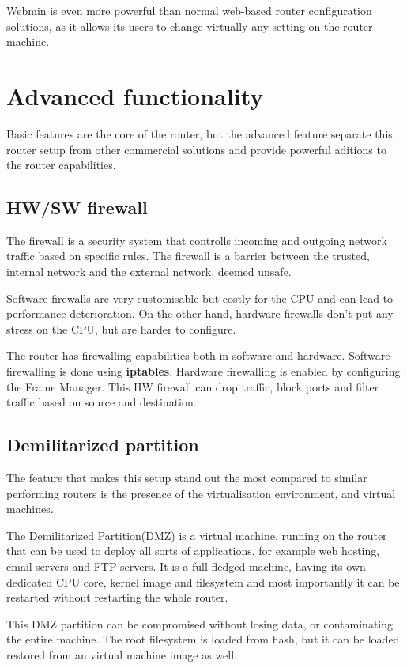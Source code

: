 Webmin is even more powerful than normal web-based router configuration
solutions, as it allows its users to change virtually any setting on the
router machine.

\section{Advanced functionality}
Basic features are the core of the router, but the advanced feature
separate this router setup from other commercial solutions and provide
powerful aditions to the router capabilities.

\subsection{HW/SW firewall}
\label{sub-sec:hw-firewall}
The firewall is a security system that controlls incoming and outgoing
network traffic based on specific rules. The firewall is a barrier 
between the trusted, internal network and the external network, deemed
unsafe.

Software firewalls are very customisable but costly for the CPU and can
lead to performance deterioration. On the other hand, hardware firewalls
don't put any stress on the CPU, but are harder to configure.

The router has firewalling capabilities both in software and hardware.
Software firewalling is done using \textbf{iptables}. Hardware firewalling
is enabled by configuring the Frame Manager. This HW firewall can drop
traffic, block ports and filter traffic based on source and destination.

\subsection{Demilitarized partition}
\label{sub-sec:dmz}
The feature that makes this setup stand out the most compared to similar
performing routers is the presence of the virtualisation environment,
and virtual machines.

The Demilitarized Partition(DMZ) is a virtual machine, running on the 
router that can be used to deploy all sorts of applications, for example
web hosting, email servers and FTP servers.
It is a full fledged machine, having its own dedicated CPU core, 
kernel image and filesystem and most importantly it can be restarted
without restarting the whole router.

This DMZ partition can be compromised without losing data, or contaminating
the entire machine. The root filesystem is loaded from flash, 
but it can be loaded restored from an virtual machine image as well.

